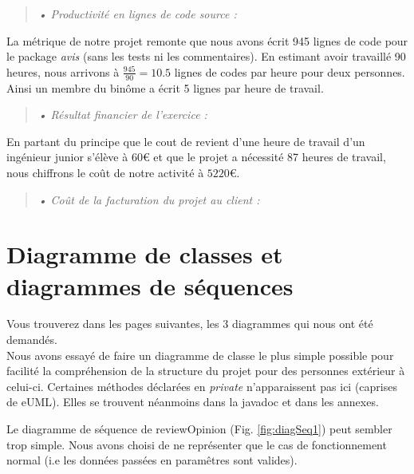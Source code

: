 \documentclass[12pt,a4paper]{report}
\begin{document}
\begin{quotation}
\textit{• Productivité en lignes de code source :}
\end{quotation}

La métrique de notre projet remonte que nous avons écrit 945 lignes de code pour le package \emph{avis} (sans les tests ni les commentaires). En estimant avoir travaillé 90 heures, nous arrivons à $\frac{945}{90} = 10.5$ lignes de codes par heure pour deux personnes. Ainsi un membre du binôme a écrit 5 lignes par heure de travail. 

\begin{quotation}
\textit{• Résultat financier de l'exercice :}
\end{quotation}

En partant du principe que le cout de revient d'une heure de travail d'un ingénieur junior s'élève à 60\euro{}  et que le projet a nécessité 87 heures de travail, nous chiffrons le coût de notre activité à $5220$\euro{}. 

\begin{quotation}
\textit{• Coût de la facturation du projet au client :}
\end{quotation}



\chapter*{Diagramme de classes et diagrammes de séquences}

\label{chapter:Diagramme de classes et diagrammes de séquences} %
Vous trouverez dans les pages suivantes, les 3 diagrammes qui nous ont été demandés. \\

Nous avons essayé de faire un diagramme de classe le plus simple possible pour facilité la compréhension de la structure du projet pour des personnes extérieur à celui-ci. Certaines méthodes déclarées en \emph{private} n'apparaissent pas ici (caprises de eUML). Elles se trouvent néanmoins dans la javadoc et dans les annexes.

Le diagramme de séquence de reviewOpinion (Fig. \ref{fig:diagSeq1}) peut sembler trop simple. Nous avons choisi de ne représenter que le cas de fonctionnement normal (i.e les données passées en paramêtres sont valides). 
\end{document}
